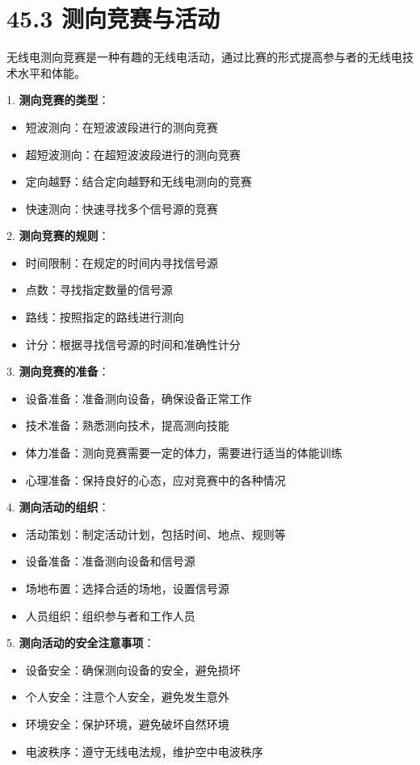 \documentclass[12pt,UTF8]{ctexbook}
\begin{document}
\section*{45.3 测向竞赛与活动}

无线电测向竞赛是一种有趣的无线电活动，通过比赛的形式提高参与者的无线电技术水平和体能。

1. \textbf{测向竞赛的类型}：
   \begin{itemize}[leftmargin=3.5em]
   \item 短波测向：在短波波段进行的测向竞赛
   \item 超短波测向：在超短波波段进行的测向竞赛
   \item 定向越野：结合定向越野和无线电测向的竞赛
   \item 快速测向：快速寻找多个信号源的竞赛
   \end{itemize}

2. \textbf{测向竞赛的规则}：
   \begin{itemize}[leftmargin=3.5em]
   \item 时间限制：在规定的时间内寻找信号源
   \item 点数：寻找指定数量的信号源
   \item 路线：按照指定的路线进行测向
   \item 计分：根据寻找信号源的时间和准确性计分
   \end{itemize}

3. \textbf{测向竞赛的准备}：
   \begin{itemize}[leftmargin=3.5em]
   \item 设备准备：准备测向设备，确保设备正常工作
   \item 技术准备：熟悉测向技术，提高测向技能
   \item 体力准备：测向竞赛需要一定的体力，需要进行适当的体能训练
   \item 心理准备：保持良好的心态，应对竞赛中的各种情况
   \end{itemize}

4. \textbf{测向活动的组织}：
   \begin{itemize}[leftmargin=3.5em]
   \item 活动策划：制定活动计划，包括时间、地点、规则等
   \item 设备准备：准备测向设备和信号源
   \item 场地布置：选择合适的场地，设置信号源
   \item 人员组织：组织参与者和工作人员
   \end{itemize}

5. \textbf{测向活动的安全注意事项}：
   \begin{itemize}[leftmargin=3.5em]
   \item 设备安全：确保测向设备的安全，避免损坏
   \item 个人安全：注意个人安全，避免发生意外
   \item 环境安全：保护环境，避免破坏自然环境
   \item 电波秩序：遵守无线电法规，维护空中电波秩序
   \end{itemize}
\end{document}
